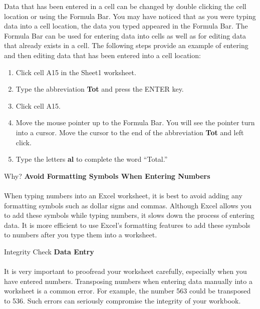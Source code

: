 Data that has been entered in a cell can be changed by double clicking the cell location or using the Formula Bar. You may have noticed that as you were typing data into a cell location, the data you typed appeared in the Formula Bar. The Formula Bar can be used for entering data into cells as well as for editing data that already exists in a cell. The following steps provide an example of entering and then editing data that has been entered into a cell location:

\begin{enumerate}
	\item Click cell \textsf{A15} in the Sheet1 worksheet.
	\item Type the abbreviation \textbf{Tot} and press the ENTER key.
	\item Click cell \textsf{A15}.
	\item Move the mouse pointer up to the Formula Bar. You will see the pointer turn into a cursor. Move the cursor to the end of the abbreviation \textbf{Tot} and left click.
	\item Type the letters \textbf{al} to complete the word ``Total.''
\end{enumerate}

\begin{center}
	\begin{infobox}{Why?}
		\textbf{Avoid Formatting Symbols When Entering Numbers}
		\\
		\\
		When typing numbers into an Excel worksheet, it is best to avoid adding any formatting symbols such as dollar signs and commas. Although Excel allows you to add these symbols while typing numbers, it slows down the process of entering data. It is more efficient to use Excel's formatting features to add these symbols to numbers after you type them into a worksheet.
	\end{infobox}
\end{center}

\begin{center}
	\begin{infobox}{Integrity Check}
		\textbf{Data Entry}
		\\
		\\
		It is very important to proofread your worksheet carefully, especially when you have entered numbers. Transposing numbers when entering data manually into a worksheet is a common error. For example, the number 563 could be transposed to 536. Such errors can seriously compromise the integrity of your workbook.
	\end{infobox}
\end{center}


